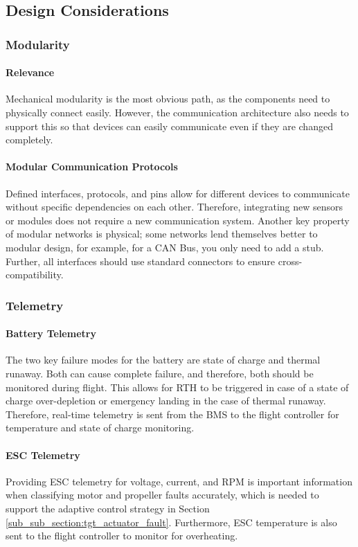\subsection{Design Considerations}\label{sub_sub_section:tgt_intra_comms_design_considerations}

\subsubsection{Modularity}\label{sub_sub_section:tgt_modularity}
\paragraph{Relevance}
Mechanical modularity is the most obvious path, as the components need to physically connect easily. However, the communication architecture also needs to support this so that devices can easily communicate even if they are changed completely.
\paragraph{Modular Communication Protocols}
Defined interfaces, protocols, and pins allow for different devices to communicate without specific dependencies on each other. Therefore, integrating new sensors or modules does not require a new communication system. Another key property of modular networks is physical; some networks lend themselves better to modular design, for example, for a \gls{CAN} Bus, you only need to add a stub. Further, all interfaces should use standard connectors to ensure cross-compatibility.

\subsubsection{Telemetry}\label{sub_sub_section:tgt_telemetry}
\paragraph{Battery Telemetry}
The two key failure modes for the battery are state of charge and thermal runaway. Both can cause complete failure, and therefore, both should be monitored during flight. This allows for \gls{RTH} to be triggered in case of a state of charge over-depletion or emergency landing in the case of thermal runaway. Therefore, real-time telemetry is sent from the \gls{BMS} to the flight controller for temperature and state of charge monitoring.
\paragraph{ESC Telemetry}
Providing \gls{ESC} telemetry for voltage, current, and \gls{RPM} is important information when classifying motor and propeller faults accurately, which is needed to support the adaptive control strategy in Section \ref{sub_sub_section:tgt_actuator_fault}. Furthermore, \gls{ESC} temperature is also sent to the flight controller to monitor for overheating. 

